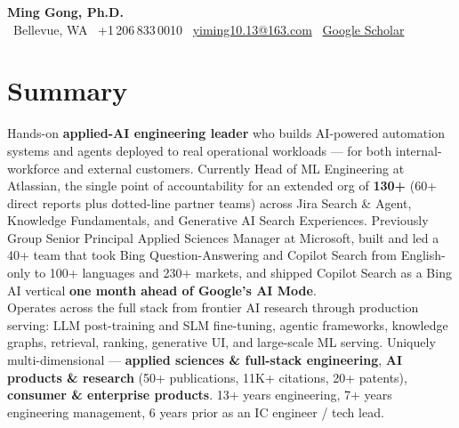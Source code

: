 \documentclass[10.5pt,letterpaper]{article}
\begin{document}
\begin{center}
  {\LARGE\bfseries\color{blue!60!black} Ming Gong, Ph.D.}\\[3pt]
  \faMapMarker* \ Bellevue, WA \quad \textbar \quad
  \faPhone \ +1\,206\,833\,0010 \quad \textbar \quad
  \faEnvelope \ \href{mailto:yiming10.13@163.com}{yiming10.13@163.com} \quad \textbar \quad
  \faGraduationCap \ \href{https://scholar.google.com/citations?user=c7JEFwsAAAAJ}{Google Scholar}
\end{center}

\section*{Summary}
Hands-on \textbf{applied-AI engineering leader} who builds AI-powered automation systems and agents deployed to real operational workloads --- for both internal-workforce and external customers. Currently Head of ML Engineering at Atlassian, the single point of accountability for an extended org of \textbf{130+} (60+ direct reports plus dotted-line partner teams) across Jira Search \& Agent, Knowledge Fundamentals, and Generative AI Search Experiences. Previously Group Senior Principal Applied Sciences Manager at Microsoft, built and led a 40+ team that took Bing Question-Answering and Copilot Search from English-only to 100+ languages and 230+ markets, and shipped Copilot Search as a Bing AI vertical \textbf{one month ahead of Google's AI Mode}.\\[4pt]
Operates across the full stack from frontier AI research through production serving: LLM post-training and SLM fine-tuning, agentic frameworks, knowledge graphs, retrieval, ranking, generative UI, and large-scale ML serving. Uniquely multi-dimensional --- \textbf{applied sciences \& full-stack engineering}, \textbf{AI products \& research} (50+ publications, 11K+ citations, 20+ patents), \textbf{consumer \& enterprise products}. 13+ years engineering, 7+ years engineering management, 6 years prior as an IC engineer / tech lead.

\end{document}
